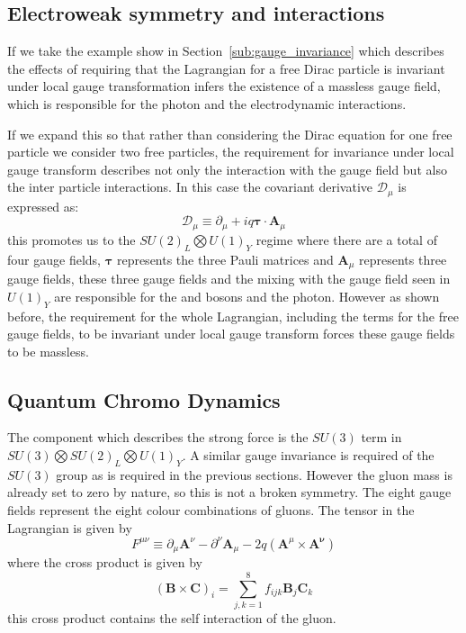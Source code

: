 \subsection{Electroweak symmetry and interactions} %
\label{sub:electro_weak_symmetry_and_interactions}
If we take the example show in Section~\ref{sub:gauge_invariance} which 
describes the effects of requiring that the Lagrangian for a free Dirac 
particle is invariant under local gauge transformation infers the existence of 
a massless gauge field, which is responsible for the photon and the 
electrodynamic interactions.

If we expand this so that rather than considering the Dirac equation for one 
free particle we consider two free particles, the requirement for invariance 
under local gauge transform describes not only the interaction with the gauge 
field but also the inter particle interactions. In this case the covariant 
derivative $\mathcal{D}_{\mu}$ is expressed as:
\begin{equation}
  \mathcal{D}_{\mu}\equiv \partial_{\mu} + iq \bm{\tau}\cdot\bm{A}_{\mu}
\end{equation}
this promotes us to the $SU(2)_{L} \bigotimes U(1)_{Y}$ regime where there are 
a total of four gauge fields, $\bm{\tau}$ represents the three Pauli matrices 
and $\bm{A}_{\mu}$ represents three gauge fields, these three gauge fields and 
the mixing with the gauge field seen in $U(1)_{Y}$ are responsible for the \PW 
and \PZ bosons and the photon. However as shown before, the requirement for the 
whole Lagrangian, including the terms for the free gauge fields, to be invariant under local gauge transform forces these gauge fields to be massless.


\subsection{Quantum Chromo Dynamics} %
\label{sub:quantum_chromo_dynamics}
The component which describes the strong force is the $SU(3)$ term in 
$SU(3)\bigotimes SU(2)_{L} \bigotimes U(1)_{Y}$. A similar gauge invariance is 
required of the $SU(3)$ group as is required in the previous sections. However 
the gluon mass is already set to zero by nature, so this is not a broken 
symmetry. The eight gauge fields represent the eight colour combinations of 
gluons. The tensor in the Lagrangian is given by
\begin{equation}
  F^{\mu\nu} \equiv \partial_{\mu}\bm{A}^{\nu} - \partial^{\nu}\bm{A}_{\mu} - 2q\left(\bm{A}^{\mu}\times\bm{A^{\nu}}\right)
\end{equation}
where the cross product is given by
\begin{equation}
  \left(\bm{B}\times\bm{C}\right)_{i} = \sum^{8}_{j,k=1}f_{ijk}\bm{B}_{j}\bm{C}_{k}
\end{equation}
this cross product contains the self interaction of the gluon.





